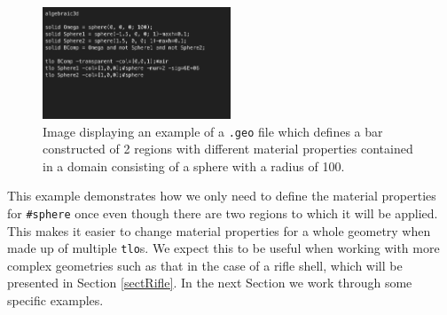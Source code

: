 \begin{figure}[H]
\begin{center}
\includegraphics[width=0.5\textwidth]{Figures/TwoSpheresExample.png}
\caption{Image displaying an example of a \texttt{.geo} file which defines a bar constructed of 2 regions with different material properties contained in a domain consisting of a sphere with a radius of 100.}\label{fig:TwoSpheresExample}
\end{center}
\end{figure}
\noindent
This example demonstrates how we only need to define the material properties for \texttt{\#sphere} once even though there are two regions to which it will be applied. This makes it easier to change material properties for a whole geometry when made up of multiple \texttt{tlo}s. We expect this to be useful when working with more complex geometries such as that in the case of a rifle shell, which will be presented in Section \ref{sectRifle}. In the next Section we work through some specific examples.















